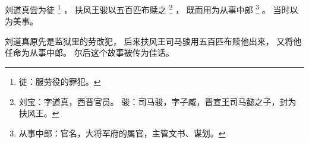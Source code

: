 
\switchcolumn*[\section{}]

刘道真尝为徒%
\footnote{%
    徒：服劳役的罪犯。
}%
，
扶风王骏以五百匹布赎之%
\footnote{%
    刘宝：字道真，西晋官员。
    骏：司马骏，字子臧，晋宣王司马懿之子，封为扶风王。
}%
，
既而用为从事中郎%
\footnote{%
    从事中郎：官名，大将军府的属官，主管文书、谋划。
}%
。
当时以为美事。

\switchcolumn

刘道真原先是监狱里的劳改犯，
后来扶风王司马骏用五百匹布赎他出来，
又将他任命为从事中郎。
尔后这个故事被传为佳话。

